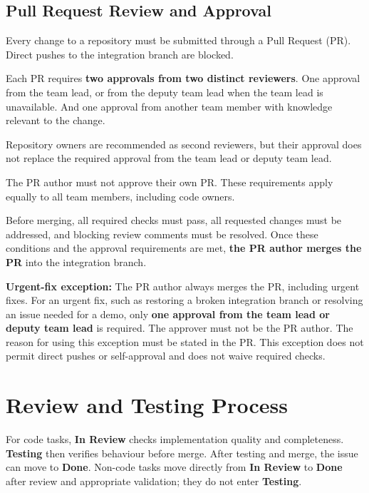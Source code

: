 \documentclass[12pt,a4paper]{article}
\begin{document}
\subsection{Pull Request Review and Approval}

Every change to a repository must be submitted through a Pull Request
(PR). Direct pushes to the integration branch are blocked.

Each PR requires \textbf{two approvals from two distinct reviewers}.
One approval from the team lead, or from the deputy team lead when the team lead is unavailable.
And one approval from another team member with knowledge relevant to the change.

Repository owners are recommended as second reviewers, but their
approval does not replace the required approval from the team lead
or deputy team lead.

The PR author must not approve their own PR. These requirements
apply equally to all team members, including code owners.

Before merging, all required checks must pass, all requested changes
must be addressed, and blocking review comments must be resolved.
Once these conditions and the approval requirements are met,
\textbf{the PR author merges the PR} into the integration branch.

\textbf{Urgent-fix exception:}
The PR author always merges the PR, including urgent fixes.
For an urgent fix, such as restoring a broken integration branch
or resolving an issue needed for a demo, only \textbf{one approval
from the team lead or deputy team lead} is required.
The approver must not be the PR author.
The reason for using this exception must be stated in the PR.
This exception does not permit direct pushes or self-approval
and does not waive required checks.


\section{Review and Testing Process}

For code tasks, \textbf{In Review} checks implementation quality and
completeness. \textbf{Testing} then verifies behaviour before merge.
After testing and merge, the issue can move to \textbf{Done}. Non-code
tasks move directly from \textbf{In Review} to \textbf{Done} after review
and appropriate validation; they do not enter \textbf{Testing}.
\end{document}
